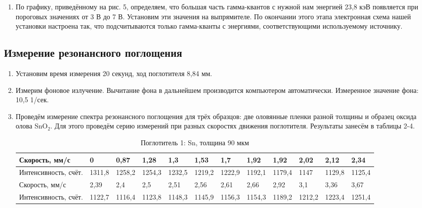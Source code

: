 \documentclass[a4paper]{article}
\begin{document}
\begin{enumerate}
\item По графику, приведённому на рис. 5, определяем, что большая часть гамма-квантов с нужной нам энергией 23,8 кэВ появляется при пороговых значениях от 3 В до 7 В. Установим эти значения на выпрямителе. По окончании этого этапа электронная схема нашей установки настроена так, что
подсчитываются только гамма-кванты с энергиями, соответствующими используемому
источнику.
\end{enumerate}

\subsection{Измерение резонансного поглощения}
\begin{enumerate}
    \item Установим время измерения 20 секунд, ход поглотителя 8,84 мм.
    \item Измерим фоновое излучение. Вычитание фона в дальнейшем
производится компьютером автоматически. Измеренное значение фона: 10,5 1/сек.
    \item Проведём измерение спектра резонансного поглощения для трёх образцов: две оловянные пленки разной толщины и образец оксида олова SnO$_2$. Для этого проведём серию измерений при разных скоростях движения поглотителя. Результаты занесём в таблицы 2-4. 
    
    \begin{table}[h]
    \centering
    \begin{center}
    \caption{Поглотитель 1: Sn, толщина 90 мкм}
    \end{center}
    \vspace{0.1cm}
    \label{tab:my_label}
    \begin{tabular}{ |p{2.5cm}||p{1cm}|p{1cm}|p{1cm}|p{1cm}|p{1cm}|p{1cm}|p{1cm}|p{1cm}|p{1cm}|p{1cm}|p{1cm}|}
 \hline
 Скорость, мм/с & 0 & 0,87 & 1,28 & 1,3 & 1,53 & 1,7 & 1,92 & 1,92 & 2,02 & 2,12 & 2,34

 \\
\hline
 Интенсивность, счёт. & 1311,8 & 1258,2 & 1254,3 & 1232,5 & 1219,2 & 1222,9 & 1192,1 & 1179,4 & 1147 & 1129,8 & 1125,4

\\
\hline
\hline
Скорость, мм/с & 2,39 & 2,4 & 2,5 & 2,51 & 2,56 & 2,61 & 2,66 & 2,92 & 3,1 & 3,36 & 3,67

 \\
 \hline
 Интенсивность, счёт.  & 1122,7 & 1116,4 & 1123,8 & 1148,3 & 1145,9 & 1156,3 & 1154,3 & 1189,2 & 1212,2 & 1223,4 & 1251,4
\\
 \hline
\end{tabular}
\end{table} 


\end{enumerate}
\end{document}
